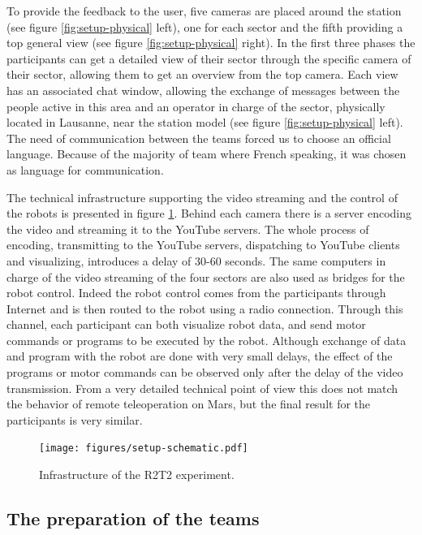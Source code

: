 \documentclass{intech-journal}
\begin{document}
To provide the feedback to the user, five cameras are placed around the station (see figure \ref{fig:setup-physical} left), one for each sector and the fifth providing a top general view (see figure \ref{fig:setup-physical} right).
In the first three phases the participants can get a detailed view of their sector through the specific camera of their sector, allowing them to get an overview from the top camera.
Each view has an associated chat window, allowing the exchange of messages between the people active in this area and an operator in charge of the sector, physically located in Lausanne, near the station model (see figure \ref{fig:setup-physical} left).
The need of communication between the teams forced us to choose an official language. 
Because of the majority of team where French speaking, it was chosen as language for communication.

The technical infrastructure supporting the video streaming and the control of the robots is presented in figure \ref{fig:setup-scheme}.
Behind each camera there is a server encoding the video and streaming it to the YouTube servers. 
The whole process of encoding, transmitting to the YouTube servers, dispatching to YouTube clients and visualizing, introduces a delay of 30-60 seconds.
The same computers in charge of the video streaming of the four sectors are also used as bridges for the robot control. 
Indeed the robot control comes from the participants through Internet and is then routed to the robot using a radio connection. 
Through this channel, each participant can both visualize robot data, and send motor commands or programs to be executed by the robot. 
Although exchange of data and program with the robot are done with very small delays, the effect of the programs or motor commands can be observed only after the delay of the video transmission. 
From a very detailed technical point of view this does not match the behavior of remote teleoperation on Mars, but the final result for the participants is very similar.

\begin{figure}[ht]
 \centering
    \texttt{[image: figures/setup-schematic.pdf]}
  \caption{Infrastructure of the R2T2 experiment.}
  \label{fig:setup-scheme} 
\end{figure}

\subsection{The preparation of the teams}
\end{document}
